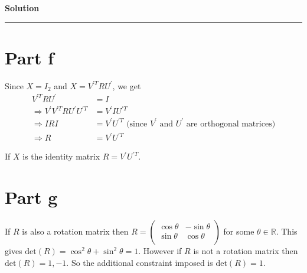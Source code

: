 \documentclass[a4paper,14pt]{article}
\newenvironment{solution}[2][]{%
    \begin{mdframed}[linecolor=blue!70!black, linewidth=2pt, roundcorner=10pt, backgroundcolor=yellow!10!white, skipabove=12pt, skipbelow=12pt]%
        \textbf{\large #2}
        \par\noindent\rule{\textwidth}{0.4pt}
}{
    \end{mdframed}
}
\begin{document}
\begin{solution}{Solution}
    \section{Part f}
      Since $X = I_{2}$ and $X = V^{'T}RU^{'}$, we get 
      \begin{align*}
        V^{'T}RU^{'} &= I \\
        \Rightarrow V^{'}V^{'T}RU^{'}U^{'T} &= V^{'}IU^{'T} \\
        \Rightarrow I R I &= V^{'}U^{'T} \text{ (since $V^{'}$ and $U^{'}$ are orthogonal matrices)}\\
        \Rightarrow R &= V^{'}U^{'T}
      \end{align*}

      If $X$ is the identity matrix $R = V^{'}U^{'T}$.
    \section{Part g}
      If $R$ is also a rotation matrix then $R = \begin{pmatrix}
        \cos \theta & - \sin \theta \\
        \sin \theta & \cos \theta \\
      \end{pmatrix}$
      for some $\theta \in \mathbb{R}$. This gives $\text{det}(R) = \cos^{2} \theta + \sin^{2} \theta = 1$. However if $R$
      is not a rotation matrix then $\text{det}(R) = 1,-1$. So the additional constraint imposed is $\text{det}(R) = 1$.

\end{solution}
\end{document}
